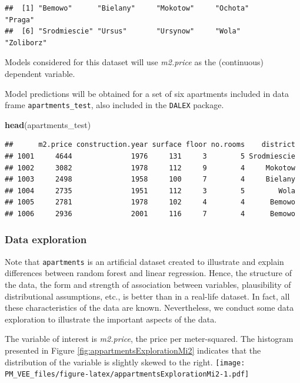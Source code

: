 \documentclass[12pt,]{krantz}
\newenvironment{Shaded}{\begin{snugshade}}{\end{snugshade}}
\newcommand{\KeywordTok}[1]{\textcolor[rgb]{0.13,0.29,0.53}{\textbf{#1}}}
\newcommand{\NormalTok}[1]{#1}
\theoremstyle{definition}
\theoremstyle{definition}
\theoremstyle{definition}
\theoremstyle{remark}
\begin{document}
\begin{verbatim}
##  [1] "Bemowo"      "Bielany"     "Mokotow"     "Ochota"      "Praga"      
##  [6] "Srodmiescie" "Ursus"       "Ursynow"     "Wola"        "Zoliborz"
\end{verbatim}

Models considered for this dataset will use \emph{m2.price} as the
(continuous) dependent variable.

Model predictions will be obtained for a set of six apartments included
in data frame \texttt{apartments\_test}, also included in the
\texttt{DALEX} package.

\begin{Shaded}
\begin{Highlighting}[]
\KeywordTok{head}\NormalTok{(apartments_test)}
\end{Highlighting}
\end{Shaded}

\begin{verbatim}
##      m2.price construction.year surface floor no.rooms    district
## 1001     4644              1976     131     3        5 Srodmiescie
## 1002     3082              1978     112     9        4     Mokotow
## 1003     2498              1958     100     7        4     Bielany
## 1004     2735              1951     112     3        5        Wola
## 1005     2781              1978     102     4        4      Bemowo
## 1006     2936              2001     116     7        4      Bemowo
\end{verbatim}

\hypertarget{exploration-apartments}{%
\subsubsection{Data exploration}\label{exploration-apartments}}

Note that \texttt{apartments} is an artificial dataset created to
illustrate and explain differences between random forest and linear
regression. Hence, the structure of the data, the form and strength of
association between variables, plausibility of distributional
assumptions, etc., is better than in a real-life dataset. In fact, all
these characteristics of the data are known. Nevertheless, we conduct
some data exploration to illustrate the important aspects of the data.

The variable of interest is \emph{m2.price}, the price per
meter-squared. The histogram presented in Figure
\ref{fig:appartmentsExplorationMi2} indicates that the distribution of
the variable is slightly skewed to the right.
\texttt{[image: PM\_VEE\_files/figure-latex/appartmentsExplorationMi2-1.pdf]}
\end{document}
